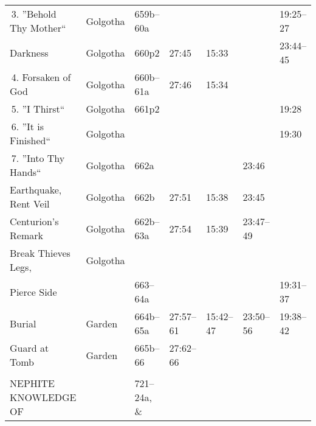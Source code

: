 \begin{longtable}[h]{l@{\hspace{0.5em}}l@{\hspace{0.5em}}l@{\hspace{0.5em}}BBBB}
\,3. ''Behold Thy Mother``                 & Golgotha            & 659b--60a          &                   &                    &                       & 19:25--27 \\
\quad Darkness                             & Golgotha            & 660p2              & 27:45             & 15:33              &                       & 23:44--45 \\
\,4. Forsaken of God                       & Golgotha            & 660b--61a          & 27:46             & 15:34              &                       & \\
\,5. ''I Thirst``                          & Golgotha            & 661p2              &                   &                    &                       & 19:28 \\
\,6. ''It is Finished``                    & Golgotha            &                    &                   &                    &                       & 19:30 \\
\,7. ''Into Thy Hands``                    & Golgotha            & 662a               &                   &                    & 23:46                 & \\
\quad Earthquake, Rent Veil                & Golgotha            & 662b               & 27:51             & 15:38              & 23:45                 & \\
\quad Centurion's Remark                   & Golgotha            & 662b--63a          & 27:54             & 15:39              & 23:47--49             & \\
\quad Break Thieves Legs,                  & Golgotha            &                    &                   &                    &                       & \\
\qquad Pierce Side                         &                     & 663--64a           &                   &                    &                       & 19:31--37 \\
\quad Burial                               & Garden              & 664b--65a          & 27:57--61         & 15:42--47          & 23:50--56             & 19:38--42 \\
\quad Guard at Tomb                        & Garden              & 665b--66           & 27:62--66         &                    &                       & \\
\\
NEPHITE KNOWLEDGE OF                       &                     & 721--24a, \&       &                   &                    &                       & \\

\end{longtable}
